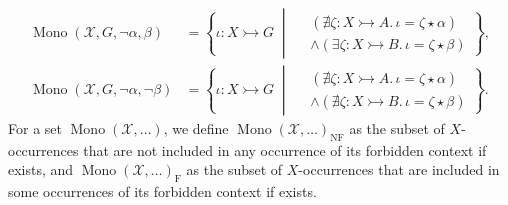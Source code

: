 \begin{notation}
\begin{align*}
        \\
        \operatorname{Mono}(\mathcal{X},G,\lnot \alpha, \beta) &= \left\{ 
            \iota \colon X \rightarrowtail G \;\middle|\; 
                \begin{aligned}  
                    &(\nexists \zeta \colon X \rightarrowtail A.\, \iota = \zeta \star \alpha) \\ 
                    &\land (\exists \zeta \colon X \rightarrowtail B.\, \iota = \zeta \star \beta)
                \end{aligned}
        \right\},
        \\
        \operatorname{Mono}(\mathcal{X},G,\lnot \alpha, \lnot \beta) &= \left\{ 
            \iota \colon X \rightarrowtail G \;\middle|\; 
                \begin{aligned}
                    &(\nexists \zeta \colon X \rightarrowtail A.\, \iota = \zeta \star \alpha) \\
                    &\land (\nexists \zeta \colon X \rightarrowtail B.\, \iota = \zeta \star \beta)
                \end{aligned}
        \right\}.
    \end{align*}
    For a set $\operatorname{Mono}(\mathcal{X},\dots)$, we define $\operatorname{Mono}(\mathcal{X},\dots)_{\operatorname{NF}}$ as the subset of \( X \)-occurrences that are not included in any occurrence of its forbidden context if exists, and  $\operatorname{Mono}(\mathcal{X},\dots)_{\operatorname{F}}$ as the subset of \( X \)-occurrences that are included in some occurrences of its forbidden context if exists.
\end{notation}

